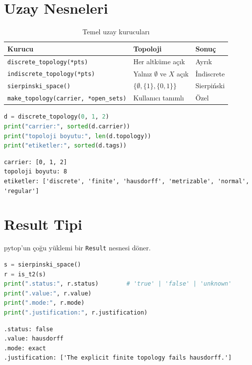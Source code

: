 \section{Uzay Nesneleri}

\begin{table}[h]
\centering
\begin{tabular}{lll}
\toprule
\textbf{Kurucu} & \textbf{Topoloji} & \textbf{Sonuç} \\
\midrule
\texttt{discrete\_topology(*pts)} & Her altküme açık & Ayrık \\
\texttt{indiscrete\_topology(*pts)} & Yalnız $\emptyset$ ve $X$ açık & İndiscrete \\
\texttt{sierpinski\_space()} & $\{\emptyset, \{1\}, \{0,1\}\}$ & Sierpiński \\
\texttt{make\_topology(carrier, *open\_sets)} & Kullanıcı tanımlı & Özel \\
\bottomrule
\end{tabular}
\caption{Temel uzay kurucuları}
\end{table}

\begin{lstlisting}[language=Python]
d = discrete_topology(0, 1, 2)
print("carrier:", sorted(d.carrier))
print("topoloji boyutu:", len(d.topology))
print("etiketler:", sorted(d.tags))
\end{lstlisting}

\begin{verbatim}
carrier: [0, 1, 2]
topoloji boyutu: 8
etiketler: ['discrete', 'finite', 'hausdorff', 'metrizable', 'normal', 'regular']
\end{verbatim}

\section{Result Tipi}

pytop'un çoğu yüklemi bir \texttt{Result} nesnesi döner.

\begin{lstlisting}[language=Python]
s = sierpinski_space()
r = is_t2(s)
print(".status:", r.status)        # 'true' | 'false' | 'unknown'
print(".value:", r.value)
print(".mode:", r.mode)
print(".justification:", r.justification)
\end{lstlisting}

\begin{verbatim}
.status: false
.value: hausdorff
.mode: exact
.justification: ['The explicit finite topology fails hausdorff.']
\end{verbatim}

